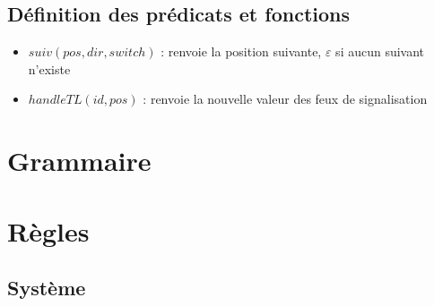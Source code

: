 \documentclass[12pt]{article}
\begin{document}
\subsection{Définition des prédicats et fonctions}

\begin{itemize}
    \item $suiv(pos, dir, switch)$ : renvoie la position suivante, $\varepsilon$ si aucun suivant n'existe
    \item $handleTL(id, pos)$ : renvoie la nouvelle valeur des feux de signalisation
\end{itemize}


\section{Grammaire}



\begin{grammar}
    \otherform{\varepsilon }{}
\end{grammar}

\vspace{0.5cm}

\begin{grammar}
    \otherform{\varepsilon}{}

\end{grammar}


\newpage
\section{Règles}

\subsection{Système}
\end{document}
